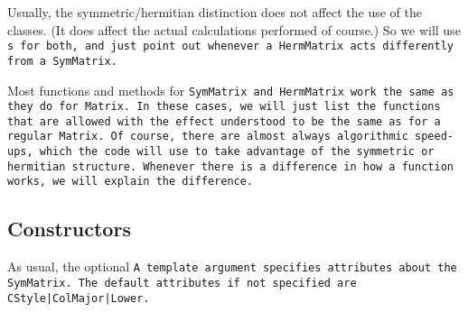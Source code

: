 Usually, the symmetric/hermitian distinction does not affect the use of the classes.
(It does affect the actual calculations performed of course.)  So we will use 
\tt{s} for both, and just point out whenever a \tt{HermMatrix} acts differently
from a \tt{SymMatrix}.

Most functions and methods for \tt{SymMatrix} and \tt{HermMatrix}
work the same as they do for \tt{Matrix}.
In these cases, we will just list the functions that are allowed with the
effect understood to be the same as for a regular \tt{Matrix}.  Of course, there are 
almost always algorithmic speed-ups, which the code will use to take advantage of the 
symmetric or hermitian structure.
Whenever there is a difference in how a function works,
we will explain the difference.


\subsection{Constructors}
\label{SymMatrix_Constructors}

As usual, the optional \tt{A} template argument specifies attributes about
the \tt{SymMatrix}.  The default attributes if not specified are
\tt{CStyle|ColMajor|Lower}.


